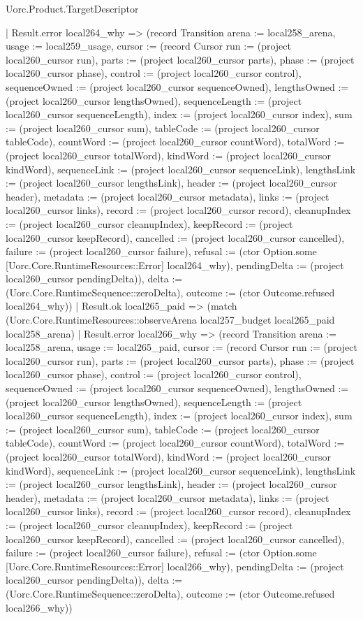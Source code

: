 \begin{lexlean}{Uorc.Product.TargetDescriptor}
\begin{semanticmodule}
{        | Result.error local264_why => (record Transition {arena := local258_arena, usage := local259_usage, cursor := (record Cursor {run := (project local260_cursor run), parts := (project local260_cursor parts), phase := (project local260_cursor phase), control := (project local260_cursor control), sequenceOwned := (project local260_cursor sequenceOwned), lengthsOwned := (project local260_cursor lengthsOwned), sequenceLength := (project local260_cursor sequenceLength), index := (project local260_cursor index), sum := (project local260_cursor sum), tableCode := (project local260_cursor tableCode), countWord := (project local260_cursor countWord), totalWord := (project local260_cursor totalWord), kindWord := (project local260_cursor kindWord), sequenceLink := (project local260_cursor sequenceLink), lengthsLink := (project local260_cursor lengthsLink), header := (project local260_cursor header), metadata := (project local260_cursor metadata), links := (project local260_cursor links), record := (project local260_cursor record), cleanupIndex := (project local260_cursor cleanupIndex), keepRecord := (project local260_cursor keepRecord), cancelled := (project local260_cursor cancelled), failure := (project local260_cursor failure), refusal := (ctor Option.some [Uorc.Core.RuntimeResources::Error] local264_why), pendingDelta := (project local260_cursor pendingDelta)}), delta := (Uorc.Core.RuntimeSequence::zeroDelta), outcome := (ctor Outcome.refused local264_why)})
        | Result.ok local265_paid => (match (Uorc.Core.RuntimeResources::observeArena local257_budget local265_paid local258_arena)
          | Result.error local266_why => (record Transition {arena := local258_arena, usage := local265_paid, cursor := (record Cursor {run := (project local260_cursor run), parts := (project local260_cursor parts), phase := (project local260_cursor phase), control := (project local260_cursor control), sequenceOwned := (project local260_cursor sequenceOwned), lengthsOwned := (project local260_cursor lengthsOwned), sequenceLength := (project local260_cursor sequenceLength), index := (project local260_cursor index), sum := (project local260_cursor sum), tableCode := (project local260_cursor tableCode), countWord := (project local260_cursor countWord), totalWord := (project local260_cursor totalWord), kindWord := (project local260_cursor kindWord), sequenceLink := (project local260_cursor sequenceLink), lengthsLink := (project local260_cursor lengthsLink), header := (project local260_cursor header), metadata := (project local260_cursor metadata), links := (project local260_cursor links), record := (project local260_cursor record), cleanupIndex := (project local260_cursor cleanupIndex), keepRecord := (project local260_cursor keepRecord), cancelled := (project local260_cursor cancelled), failure := (project local260_cursor failure), refusal := (ctor Option.some [Uorc.Core.RuntimeResources::Error] local266_why), pendingDelta := (project local260_cursor pendingDelta)}), delta := (Uorc.Core.RuntimeSequence::zeroDelta), outcome := (ctor Outcome.refused local266_why)})
}
\end{semanticmodule}
\end{lexlean}
